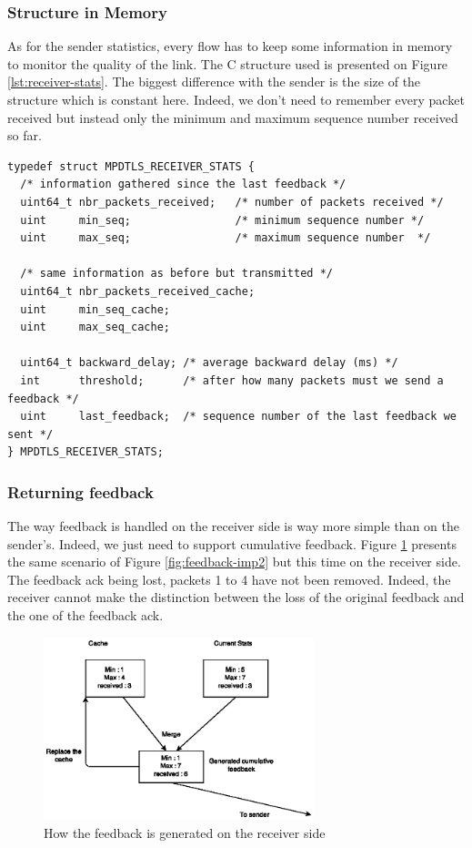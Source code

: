\subsubsection{Structure in Memory}

As for the sender statistics, every flow has to keep some information in memory to monitor the quality of the link. The C structure used is presented on Figure \ref{lst:receiver-stats}. The biggest difference with the sender is the size of the structure which is constant here. Indeed, we don't need to remember every packet received but instead only the minimum and maximum sequence number received so far.

\begin{lstlisting}[caption=Receiver structure to store statistics, label=lst:receiver-stats]
typedef struct MPDTLS_RECEIVER_STATS {
  /* information gathered since the last feedback */
  uint64_t nbr_packets_received;   /* number of packets received */
  uint     min_seq;                /* minimum sequence number */
  uint     max_seq;                /* maximum sequence number  */
  
  /* same information as before but transmitted */
  uint64_t nbr_packets_received_cache;
  uint     min_seq_cache;
  uint     max_seq_cache;
  
  uint64_t backward_delay; /* average backward delay (ms) */
  int      threshold;      /* after how many packets must we send a feedback */
  uint     last_feedback;  /* sequence number of the last feedback we sent */
} MPDTLS_RECEIVER_STATS;
\end{lstlisting}

\subsubsection{Returning feedback}

The way feedback is handled on the receiver side is way more simple than on the sender's. Indeed, we just need to support cumulative feedback. Figure \ref{fig:feedback-imp3} presents the same scenario of Figure \ref{fig:feedback-imp2} but this time on the receiver side. The feedback ack being lost, packets 1 to 4 have not been removed. Indeed, the receiver cannot make the distinction between the loss of the original feedback and the one of the feedback ack.

\begin{figure}[!ht]
\centering
\includegraphics[width=0.7\textwidth]{images/Feedback-implem3.eps}
\caption{How the feedback is generated on the receiver side}
\label{fig:feedback-imp3}
\end{figure}

